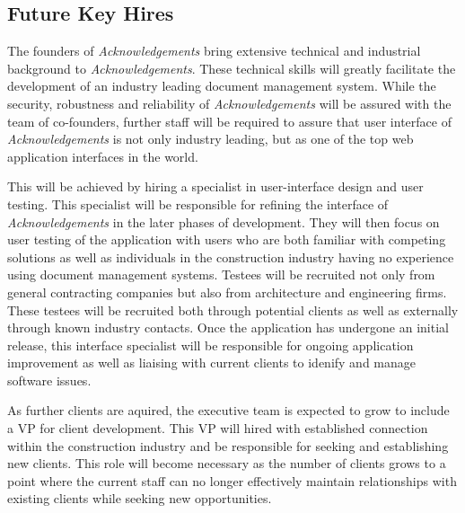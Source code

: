 \subsection{Future Key Hires}
The founders of {\it Acknowledgements} bring extensive technical and industrial background to {\it Acknowledgements}. These technical skills will greatly facilitate the development of an industry leading document management system. While the security, robustness and reliability of {\it Acknowledgements} will be assured with the team of co-founders, further staff will be required to assure that user interface of {\it Acknowledgements} is not only industry leading, but as one of the top web application interfaces in the world.

This will be achieved by hiring a specialist in user-interface design and user testing. This specialist will be responsible for refining the interface of {\it Acknowledgements} in the later phases of development. They will then focus on user testing of the application with users who are both familiar with competing solutions as well as individuals in the construction industry having no experience using document management systems. Testees will be recruited not only from general contracting companies but also from architecture and engineering firms. These testees will be recruited both through potential clients as well as externally through known industry contacts. Once the application has undergone an initial release, this interface specialist will be responsible for ongoing application improvement as well as liaising with current clients to idenify and manage software issues.

As further clients are aquired, the executive team is expected to grow to include a VP for client development. This VP will hired with established connection within the construction industry and be responsible for seeking and establishing new clients. This role will become necessary as the number of clients grows to a point where the current staff can no longer effectively maintain relationships with existing clients while seeking new opportunities.